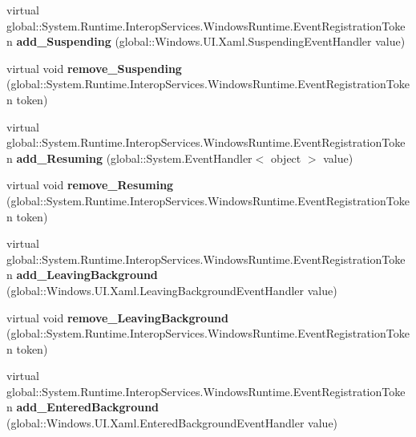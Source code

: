 \begin{DoxyCompactItemize}
virtual global\+::\+System.\+Runtime.\+Interop\+Services.\+Windows\+Runtime.\+Event\+Registration\+Token {\bfseries add\+\_\+\+Suspending} (global\+::\+Windows.\+U\+I.\+Xaml.\+Suspending\+Event\+Handler value)
\item 
\mbox{\label{class_windows_1_1_u_i_1_1_xaml_1_1_application_a697beee9101ae37839824e38fb697688}} 
virtual void {\bfseries remove\+\_\+\+Suspending} (global\+::\+System.\+Runtime.\+Interop\+Services.\+Windows\+Runtime.\+Event\+Registration\+Token token)
\item 
\mbox{\label{class_windows_1_1_u_i_1_1_xaml_1_1_application_aebc7735fefc7c00f75274d1e1dad4cc1}} 
virtual global\+::\+System.\+Runtime.\+Interop\+Services.\+Windows\+Runtime.\+Event\+Registration\+Token {\bfseries add\+\_\+\+Resuming} (global\+::\+System.\+Event\+Handler$<$ object $>$ value)
\item 
\mbox{\label{class_windows_1_1_u_i_1_1_xaml_1_1_application_ae71f03dad163a08e042d3b65126ad419}} 
virtual void {\bfseries remove\+\_\+\+Resuming} (global\+::\+System.\+Runtime.\+Interop\+Services.\+Windows\+Runtime.\+Event\+Registration\+Token token)
\item 
\mbox{\label{class_windows_1_1_u_i_1_1_xaml_1_1_application_a652fc06a2f576820519f4a6302fa3a92}} 
virtual global\+::\+System.\+Runtime.\+Interop\+Services.\+Windows\+Runtime.\+Event\+Registration\+Token {\bfseries add\+\_\+\+Leaving\+Background} (global\+::\+Windows.\+U\+I.\+Xaml.\+Leaving\+Background\+Event\+Handler value)
\item 
\mbox{\label{class_windows_1_1_u_i_1_1_xaml_1_1_application_a33a3ccc165dd32a08e6cbc543ea18565}} 
virtual void {\bfseries remove\+\_\+\+Leaving\+Background} (global\+::\+System.\+Runtime.\+Interop\+Services.\+Windows\+Runtime.\+Event\+Registration\+Token token)
\item 
\mbox{\label{class_windows_1_1_u_i_1_1_xaml_1_1_application_a1ea6c3f747b180eb0e3d0485f1427ce1}} 
virtual global\+::\+System.\+Runtime.\+Interop\+Services.\+Windows\+Runtime.\+Event\+Registration\+Token {\bfseries add\+\_\+\+Entered\+Background} (global\+::\+Windows.\+U\+I.\+Xaml.\+Entered\+Background\+Event\+Handler value)

\end{DoxyCompactItemize}
